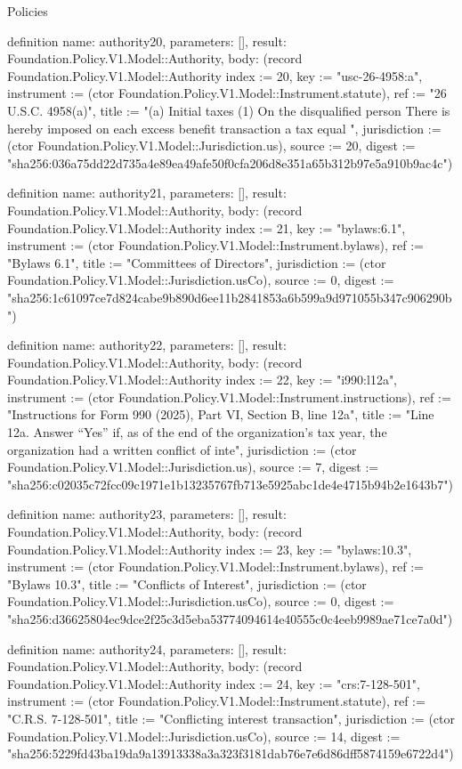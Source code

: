 \begin{lexlean}{Policies}
\begin{semanticmodule}
definition{
  name: authority20,
  parameters: [],
  result: Foundation.Policy.V1.Model::Authority,
  body: (record Foundation.Policy.V1.Model::Authority {index := 20, key := "usc-26-4958:a", instrument := (ctor Foundation.Policy.V1.Model::Instrument.statute), ref := "26 U.S.C. 4958(a)", title := "(a) Initial taxes (1) On the disqualified person There is hereby imposed on each excess benefit transaction a tax equal ", jurisdiction := (ctor Foundation.Policy.V1.Model::Jurisdiction.us), source := 20, digest := "sha256:036a75dd22d735a4e89ea49afe50f0cfa206d8e351a65b312b97e5a910b9ac4c"})
}

definition{
  name: authority21,
  parameters: [],
  result: Foundation.Policy.V1.Model::Authority,
  body: (record Foundation.Policy.V1.Model::Authority {index := 21, key := "bylaws:6.1", instrument := (ctor Foundation.Policy.V1.Model::Instrument.bylaws), ref := "Bylaws 6.1", title := "Committees of Directors", jurisdiction := (ctor Foundation.Policy.V1.Model::Jurisdiction.usCo), source := 0, digest := "sha256:1c61097ce7d824cabe9b890d6ee11b2841853a6b599a9d971055b347c906290b"})
}

definition{
  name: authority22,
  parameters: [],
  result: Foundation.Policy.V1.Model::Authority,
  body: (record Foundation.Policy.V1.Model::Authority {index := 22, key := "i990:l12a", instrument := (ctor Foundation.Policy.V1.Model::Instrument.instructions), ref := "Instructions for Form 990 (2025), Part VI, Section B, line 12a", title := "Line 12a. Answer “Yes” if, as of the end of the organization’s tax year, the organization had a written conflict of inte", jurisdiction := (ctor Foundation.Policy.V1.Model::Jurisdiction.us), source := 7, digest := "sha256:c02035c72fcc09c1971e1b13235767fb713e5925abc1de4e4715b94b2e1643b7"})
}

definition{
  name: authority23,
  parameters: [],
  result: Foundation.Policy.V1.Model::Authority,
  body: (record Foundation.Policy.V1.Model::Authority {index := 23, key := "bylaws:10.3", instrument := (ctor Foundation.Policy.V1.Model::Instrument.bylaws), ref := "Bylaws 10.3", title := "Conflicts of Interest", jurisdiction := (ctor Foundation.Policy.V1.Model::Jurisdiction.usCo), source := 0, digest := "sha256:d36625804ec9dce2f25c3d5eba53774094614e40555c0c4eeb9989ae71ce7a0d"})
}

definition{
  name: authority24,
  parameters: [],
  result: Foundation.Policy.V1.Model::Authority,
  body: (record Foundation.Policy.V1.Model::Authority {index := 24, key := "crs:7-128-501", instrument := (ctor Foundation.Policy.V1.Model::Instrument.statute), ref := "C.R.S. 7-128-501", title := "Conflicting interest transaction", jurisdiction := (ctor Foundation.Policy.V1.Model::Jurisdiction.usCo), source := 14, digest := "sha256:5229fd43ba19da9a13913338a3a323f3181dab76e7e6d86dff5874159e6722d4"})
}


\end{semanticmodule}
\end{lexlean}
